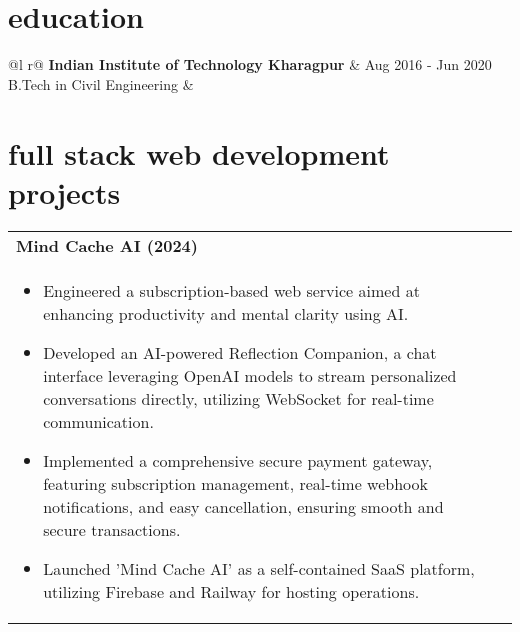 \documentclass[a4paper,8pt]{article}
\begin{document}
\section{education}
\begin{tabularx}{\linewidth}{ @{}l r@{} }
\color[HTML]{1C033C} \textbf{Indian Institute of Technology Kharagpur} & \hfill \color[HTML]{371e77} Aug 2016 - Jun 2020 \\
\color[HTML]{371e77} B.Tech in Civil Engineering & \hfill \color[HTML]{4B28A4} \textit{\textbf{}} \\
\end{tabularx}

\vspace{-8pt}

\section{full stack web development projects}
\begin{tabularx}{\linewidth}{ @{}l r@{} }
\textbf{{Mind Cache AI (2024)}} \hfill \color[HTML]{371e77} \\[1pt]
\begin{minipage}[t]{\linewidth}
    \begin{itemize}[nosep,after=\strut, leftmargin=2em, itemsep=2pt]
        \item Engineered a subscription-based web service aimed at enhancing productivity and mental clarity using AI.
        \item Developed an AI-powered Reflection Companion, a chat interface leveraging OpenAI models to stream personalized conversations directly, utilizing WebSocket for real-time communication.
        \item Implemented a comprehensive secure payment gateway, featuring subscription management, real-time webhook notifications, and easy cancellation, ensuring smooth and secure transactions.
        \item Launched 'Mind Cache AI' as a self-contained SaaS platform, utilizing Firebase and Railway for hosting operations.
    \end{itemize}
\end{minipage}
\end{tabularx}

\vspace{-4pt}
\end{document}
